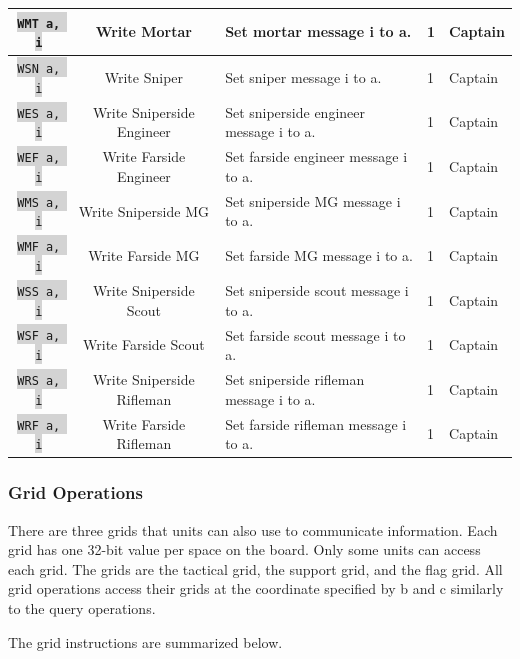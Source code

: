 \documentclass{article}
\newcommand{\vnscode}[1]{\colorbox{lightgray}{\lstinline[language=vns]{#1}}}
\begin{document}
\begin{minipage}{\textwidth}
\begin{tabular}{|c|c|l|l|l|}
    \vnscode{WMT a, i} & Write Mortar & Set mortar message i to a. & 1 & Captain \\ \hline
    \vnscode{WSN a, i} & Write Sniper & Set sniper message i to a. & 1 & Captain \\ \hline
    \vnscode{WES a, i} & Write Sniperside Engineer & Set sniperside engineer message i to a. & 1 & Captain \\ \hline
    \vnscode{WEF a, i} & Write Farside Engineer & Set farside engineer message i to a. & 1 & Captain \\ \hline
    \vnscode{WMS a, i} & Write Sniperside MG & Set sniperside MG message i to a. & 1 & Captain \\ \hline
    \vnscode{WMF a, i} & Write Farside MG & Set farside MG message i to a. & 1 & Captain \\ \hline
    \vnscode{WSS a, i} & Write Sniperside Scout & Set sniperside scout message i to a. & 1 & Captain \\ \hline
    \vnscode{WSF a, i} & Write Farside Scout & Set farside scout message i to a. & 1 & Captain \\ \hline
    \vnscode{WRS a, i} & Write Sniperside Rifleman & Set sniperside rifleman message i to a. & 1 & Captain \\ \hline
    \vnscode{WRF a, i} & Write Farside Rifleman & Set farside rifleman message i to a. & 1 & Captain \\ \hline
\end{tabular}
\end{minipage}

\subsubsection{Grid Operations}

There are three grids that units can also use to communicate information. Each
grid has one 32-bit value per space on the board. Only some units can access
each grid. The grids are the tactical grid, the support grid, and the flag grid.
All grid operations access their grids at the coordinate specified by b and c
similarly to the query operations.

The grid instructions are summarized below.
\end{document}
